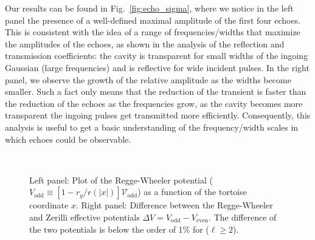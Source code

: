 \documentclass[article,aps,nofootinbib,twocolumn,superscriptaddress]{revtex4-1}
\begin{document}
Our results can be found in Fig.~\ref{fig:echo_sigma}, where we notice in the left panel the presence of a well-defined maximal amplitude of the first four echoes. This is consistent with the idea of a range of frequencies/widths that maximize the amplitudes of the echoes, as shown in the analysis of the reflection and transmission coefficients: the cavity is transparent for small widths of the ingoing Gaussian (large frequencies) and is reflective for wide incident pulses. In the right panel, we observe the growth of the relative amplitude as the widths become smaller. Such a fact only means that the reduction of the transient is faster than the reduction of the echoes as the frequencies grow, as the cavity becomes more transparent the ingoing pulses get transmitted more efficiently. Consequently, this analysis is useful to get a basic understanding of the frequency/width scales in which echoes could be observable.  

\begin{figure}
\centering
{} \,
\caption{\label{fig:evenodd_potentials} Left panel: Plot of the Regge-Wheeler potential ($V_{\mathrm{odd}}\equiv[1-r_g/r(|x|)]\mathcal{V}_{\mathrm{odd}}$) as a function of the tortoise coordinate $x$. Right panel: Difference between the Regge-Wheeler and Zerilli effective potentials $\Delta V=V_{\mathrm{odd}}-V_{\mathrm{even}}$. The difference of the two potentials is below the order of 1\% for ($\ell\geq 2$).} 
\end{figure}
\end{document}
